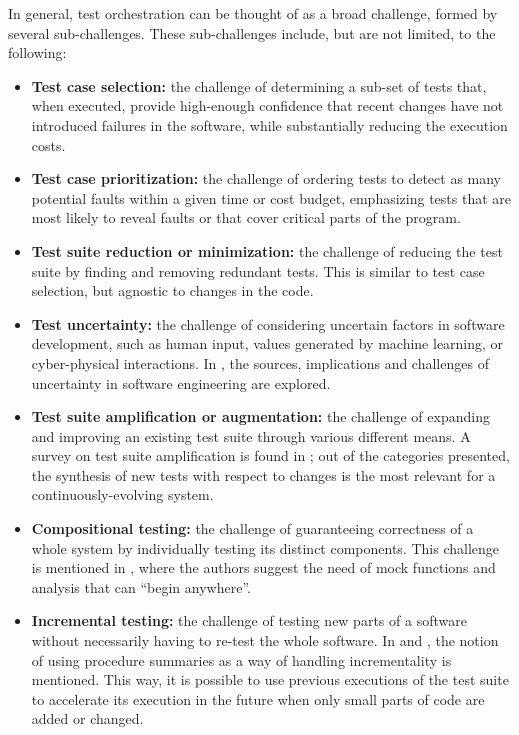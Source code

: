 In general, test orchestration can be thought of as a broad challenge, formed by several sub-challenges.
These sub-challenges include, but are not limited, to the following:
\begin{itemize}
	\item \textbf{Test case selection:} the challenge of determining a sub-set of tests that, when executed, provide high-enough confidence that recent changes have not introduced failures in the software, while substantially reducing the execution costs.
	\item \textbf{Test case prioritization:} the challenge of ordering tests to detect as many potential faults within a given time or cost budget, emphasizing tests that are most likely to reveal faults or that cover critical parts of the program.
	\item \textbf{Test suite reduction or minimization:} the challenge of reducing the test suite by finding and removing redundant tests. This is similar to test case selection, but agnostic to changes in the code.
	\item \textbf{Test uncertainty:} the challenge of considering uncertain factors in software development, such as human input, values generated by machine learning, or cyber-physical interactions. In \cite{garlan_software_2010}, the sources, implications and challenges of uncertainty in software engineering are explored.
	\item \textbf{Test suite amplification or augmentation:} the challenge of expanding and improving an existing test suite through various different means. A survey on test suite amplification is found in \cite{danglot_snowballing_2019}; out of the categories presented, the synthesis of new tests with respect to changes is the most relevant for a continuously-evolving system. 
	\item \textbf{Compositional testing:} the challenge of guaranteeing correctness of a whole system by individually testing its distinct components. This challenge is mentioned in \cite{harman_start-ups_2018}, where the authors suggest the need of mock functions and analysis that can ``begin anywhere''.
	\item \textbf{Incremental testing:} the challenge of testing new parts of a software without necessarily having to re-test the whole software. In \cite{harman_start-ups_2018} and \cite{ohearn_continuous_2018}, the notion of using procedure summaries as a way of handling incrementality is mentioned. This way, it is possible to use previous executions of the test suite to accelerate its execution in the future when only small parts of code are added or changed.
\end{itemize}

